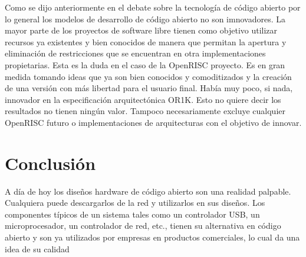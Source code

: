 Como se dijo anteriormente en el debate sobre la tecnología de código abierto por lo general los modelos de desarrollo de código abierto no son imnovadores.
 La mayor parte de los proyectos de software libre tienen como objetivo utilizar recursos ya existentes y bien conocidos de manera que permitan la apertura y eliminación de restricciones que se encuentran en otra implementaciones propietarias. Esta es la duda en el caso de la OpenRISC proyecto. Es en gran medida tomando ideas que ya son bien conocidos y comoditizados
y la creación de una versión con más libertad para el usuario final. Había muy poco, si
nada, innovador en la especificación arquitectónica OR1K. Esto no quiere decir
los resultados no tienen ningún valor. Tampoco necesariamente excluye cualquier OpenRISC futuro
o implementaciones de arquitecturas con el objetivo de innovar.

\section{Conclusión}

A día de hoy los diseños hardware de código abierto son una realidad palpable. Cualquiera puede descargarlos de la red y utilizarlos en sus diseños. Los componentes típicos de un sistema tales como un controlador USB, un microprocesador, un controlador de red, etc., tienen su alternativa en código abierto y son ya utilizados por empresas en productos comerciales, lo cual da una idea de su calidad




\begin{figure}[h!]
 \begin{center}
  \label{fig:esquema}
 \end{center}
\end{figure}





